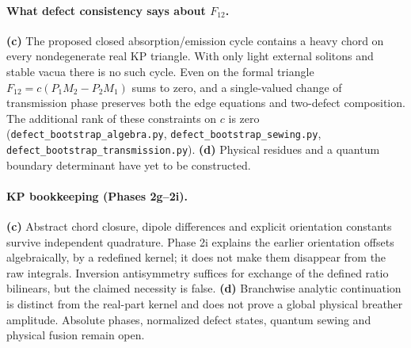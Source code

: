 \documentclass[11pt,a4paper]{article}
\newcommand{\Lc}{\textsf{\textbf{(c)}}\xspace}
\newcommand{\Ld}{\textsf{\textbf{(d)}}\xspace}
\newcommand{\file}[1]{\nolinkurl{#1}}
\theoremstyle{remark}\newtheorem{remark}[proposition]{Remark}
\begin{document}
\paragraph{What defect consistency says about $F_{12}$.}
\Lc The proposed closed absorption/emission cycle contains a heavy chord
on every nondegenerate real KP triangle. With only light external solitons
and stable vacua there is no such cycle. Even on the formal triangle
$F_{12}=c(P_1M_2-P_2M_1)$ sums to zero, and a single-valued change of
transmission phase preserves both the edge equations and two-defect
composition. The additional rank of these constraints on $c$ is zero
(\file{defect_bootstrap_algebra.py}, \file{defect_bootstrap_sewing.py},
\file{defect_bootstrap_transmission.py}). \Ld Physical residues and a
quantum boundary determinant have yet to be constructed.

\paragraph{KP bookkeeping (Phases 2g--2i).}
\Lc Abstract chord closure, dipole differences and explicit orientation
constants survive independent quadrature. Phase 2i explains the earlier
orientation offsets algebraically, by a redefined kernel; it does not make
them disappear from the raw integrals. Inversion antisymmetry suffices for
exchange of the defined ratio bilinears, but the claimed necessity is false.
\Ld Branchwise analytic continuation is distinct from the real-part kernel
and does not prove a global physical breather amplitude. Absolute phases,
normalized defect states, quantum sewing and physical fusion remain open.
\end{document}
